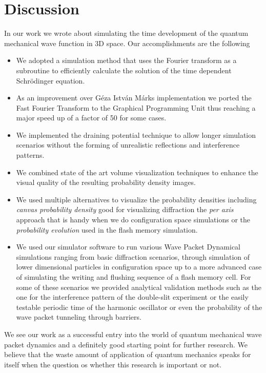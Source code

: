 \section{Discussion}
\label{sec:discussion}

In our work we wrote about simulating the time development of the quantum mechanical wave function in 3D space.
Our accomplishments are the following
\begin{itemize}
	\item We adopted a simulation method that uses the Fourier transform as a subroutine to efficiently calculate the solution of the time dependent Schrödinger equation.
	\item As an improvement over Géza István Márks implementation we ported the Fast Fourier Transform to the Graphical Programming Unit thus reaching a major speed up of a factor of 50 for some cases.
	\item We implemented the draining potential technique to allow longer simulation scenarios without the forming of unrealistic reflections and interference patterns.
	\item We combined state of the art volume visualization techniques to enhance the visual quality of the resulting probability density images.
	\item We used multiple alternatives to visualize the probability densities including \textit{canvas probability density} good for visualizing diffraction the \textit{per axis} approach that is handy when we do configuration space simulations or the \textit{probability evolution} used in the flash memory simulation.
	\item We used our simulator software to run various Wave Packet Dynamical simulations ranging from basic diffraction scenarios, through simulation of lower dimensional particles in configuration space up to a more advanced case of simulating the writing and flushing sequence of a flash memory cell. For some of these scenarios we provided analytical validation methods such as the one for the interference pattern of the double-slit experiment or the easily testable periodic time of the harmonic oscillator or even the probability of the wave packet tunneling through barriers.
\end{itemize}
We see our work as a successful entry into the world of quantum mechanical wave packet dynamics and a definitely good starting point for further research.
We believe that the waste amount of application of quantum mechanics speaks for itself when the question os whether this research is important or not.
